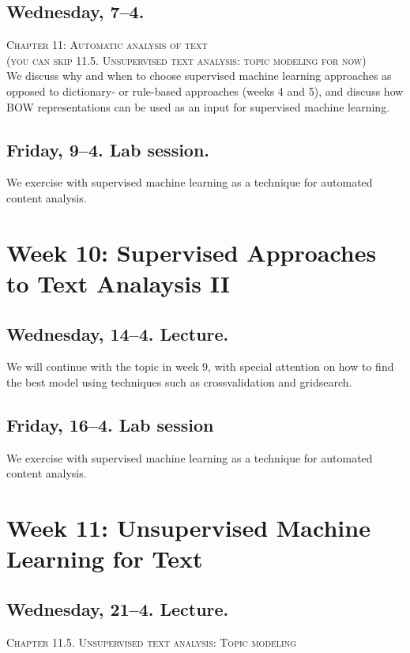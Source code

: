 \subsection*{Wednesday, 7--4.}
\textsc{ Chapter 11: Automatic analysis of text}\\
\textsc{ (you can skip 11.5. Unsupervised text analysis: topic modeling for now)}\\

We discuss why and when to choose supervised machine learning approaches as opposed to dictionary- or rule-based approaches (weeks 4 and 5), and discuss how BOW representations can be used as an input for supervised machine learning.

\subsection*{Friday, 9--4. Lab session.}
We exercise with supervised machine learning as a technique for automated content analysis.





\section*{Week 10: Supervised Approaches to Text Analaysis II}

\subsection*{Wednesday, 14--4. Lecture.}
We will continue with the topic in week 9, with special attention on how to find the best model using techniques such as crossvalidation and gridsearch.

\subsection*{Friday, 16--4. Lab session}
We exercise with supervised machine learning as a technique for automated content analysis.



\section*{Week 11: Unsupervised Machine Learning for Text}

\subsection*{Wednesday, 21--4. Lecture.}
\textsc{ Chapter 11.5. Unsupervised text analysis: Topic modeling}\\


